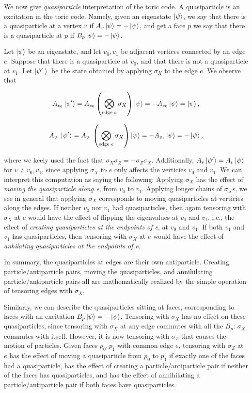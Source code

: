 \documentclass{article}
\theoremstyle{definition}
\numberwithin{figure}{section}
\begin{document}
We now give \textit{quasiparticle} interpretation of the toric code. A quasiparticle is an excitation in the toric code. Namely, given an eigenstate $\left|\psi\right>$, we say that there is a quasiparticle at a vertex $v$ if $A_v\left|\psi\right>=-\left|\psi\right>$, and get a face $p$ we say that there is a quasiparticle at $p$ if $B_p\left|\psi\right>=-\left|\psi\right>$.

Let $\left|\psi\right>$ be an eigenstate, and let $v_0,v_1$ be adjacent vertices connected by an edge $e$. Suppose that there is a quasiparticle at $v_0$, and that there is not a quasiparticle at $v_1$. Let $\left| \psi'\right>$ be the state obtained by applying $\sigma_X$ to the edge $e$. We observe that

$$A_{v_0}\left| \psi'\right> = A_{v_0}\left(\bigotimes_{\text{edge }e}\sigma_X\right)\left|\psi\right>=-A_{v_0}\left|\psi\right>=\left|\psi\right>,$$

$$A_{v_1}\left| \psi'\right> = A_{v_1}\left(\bigotimes_{\text{edge }e}\sigma_X\right)\left|\psi\right>=-A_{v_1}\left|\psi\right>=-\left|\psi\right>,$$

where we keely used the fact that $\sigma_X\sigma_Z=-\sigma_Z\sigma_X$. Additionally, $A_{v}\left|\psi'\right>=A_{v}\left|\psi\right>$ for $v\neq v_0,v_1$, since applying $\sigma_X$ to $e$ only affects the verticies $v_0$ and $v_1$. We can interpret this computation as saying the following: Applying $\sigma_X$ has the effect of \textit{moving the quasiparticle along e}, from $v_0$ to $v_1$. Applying longer chains of $\sigma_X$s, we see in general that applying $\sigma_X$ corresponds to moving quasiparticles at verticies along the edges. If neither $v_0$ nor $v_1$ had quasiparticles, then again tensoring with $\sigma_X$ at $e$ would have the effect of flipping the eigenvalues at $v_0$ and $v_1$, i.e., the effect of \textit{creating quasiparticles at the endpoints of e}, at $v_0$ and $v_1$. If both $v_1$ and $v_1$ has quasiparticles, then tensoring with $\sigma_X$ at $e$ would have the effect of \textit{anhilating quasiparticles at the endpoints of e}.

In summary, the quasiparticles at edges are their own antiparticle. Creating particle/antiparticle pairs, moving the quasiparticles, and annihilating particle/antiparticle pairs all are mathematically realized by the simple operation of tensoring edges with $\sigma_X$.

Similarly, we can describe the quasiparticles sitting at faces, corresponding to faces with an excitation $B_p\left|\psi\right>=-\left|\psi\right>$. Tensoring with $\sigma_X$ has no effect on these quasiparticles, since tensoring with $\sigma_X$ at any edge commutes with all the $B_p$: $\sigma_X$ commutes with itself. However, it is now tensoring with $\sigma_Z$ that causes the motion of particles. Given faces $p_0,p_1$ with common edge $e$, tensoring with $\sigma_Z$ at $e$ has the effect of moving a quasiparticle from $p_0$ to $p_1$ if exactly one of the faces had a quasiparticle, has the effect of creating a particle/antiparticle pair if neither of the faces has quasiparticles, and has the effect of annihilating a particle/antiparticle pair if both faces have quasiparticles.
\end{document}
